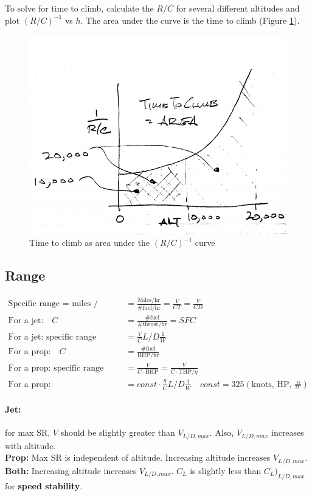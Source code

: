 \documentclass[draft=false, titlepage]{article}
\begin{document}
To solve for time to climb, calculate the $R/C$ for several different altitudes and plot $(R/C)^{-1}$ vs $h$. The area under the curve is the time to climb (Figure \ref{fig:p82_timeToClimb}).
\begin{figure}[ht]
	\centering
	\includegraphics[width=0.5\linewidth]{Figures/p82_timeToClimb.PNG}
	\caption{Time to climb as area under the $(R/C)^{-1}$ curve}
	\label{fig:p82_timeToClimb}
\end{figure}

\subsection{Range}
\begin{align*}
\text{Specific range = miles / \# fuel} &= \frac{\text{Miles/hr}}{\text{\# fuel/hr}} = \frac{V}{CT} = \frac{V}{CD}\\
\text{For a jet:} \quad C&= \frac{\text{\# fuel}}{\text{\# thrust/hr}} = SFC\\
\text{For a jet: specific range} &= \frac{V}{C}L/D \frac{1}{W}\\
\text{For a prop:}\quad  C &= \frac{\text{\# fuel}}{\text{BHP/hr}}\\
\text{For a prop: specific range} &= \frac{V}{C\cdot \text{BHP}} = \frac{V}{C\cdot \text{THP}/\eta}\\
\text{For a prop:} &= const \cdot \frac{\eta}{C}L/D \frac{1}{W}\quad const = 325( \text{knots, HP, \#})
\end{align*}
\paragraph*{Jet:} for max SR, $V$ should be slightly greater than $V_{L/D,max}$. Also, $V_{L/D,max}$ increases with altitude.\\
\textbf{Prop:} Max SR is independent of altitude. Increasing altitude increases $V_{L/D,max}$.\\
\textbf{Both:} Increasing altitude increases $V_{L/D,max}$. $C_L$ is slightly less than $C_L\big)_{L/D,max}$ for \textbf{speed stability}.
\end{document}
